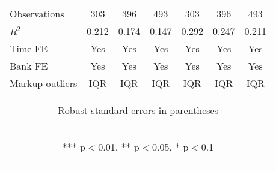\documentclass[]{article}
\begin{document}
\begin{center}
\begin{tabular}{lcccccc}
Observations & 303 & 396 & 493 & 303 & 396 & 493 \\
$R^2$ & 0.212 & 0.174 & 0.147 & 0.292 & 0.247 & 0.211 \\
Time FE & Yes & Yes & Yes & Yes & Yes & Yes \\
Bank FE & Yes & Yes & Yes & Yes & Yes & Yes \\
 Markup outliers & IQR & IQR & IQR & IQR & IQR & IQR \\ \hline
\multicolumn{7}{c}{\begin{footnotesize} Robust standard errors in parentheses\end{footnotesize}} \\
\multicolumn{7}{c}{\begin{footnotesize} *** p$<$0.01, ** p$<$0.05, * p$<$0.1\end{footnotesize}} \\
\end{tabular}
\end{center}
\end{document}
